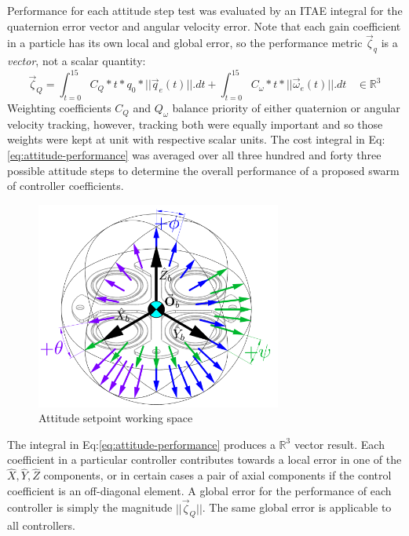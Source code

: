 \par
Performance for each attitude step test was evaluated by an ITAE integral for the quaternion error vector and angular velocity error. Note that each gain coefficient in a particle has its own local and global error, so the performance metric $\vec{\zeta}_{q}$ is a \emph{vector}, not a scalar quantity:
\begin{equation}\label{eq:attitude-performance}
\vec{\zeta}_{Q}=\int_{t=0}^{15}C_Q*t*q_0*||\vec{q}_e(t)||.dt+\int_{t=0}^{15}C_\omega*t*||\vec{\omega}_e(t)||.dt~~~~\in\mathbb{R}^{3}
\end{equation}
Weighting coefficients $C_Q$ and $Q_\omega$ balance priority of either quaternion or angular velocity tracking, however, tracking both were equally important and so those weights were kept at unit with respective scalar units. The cost integral in Eq:\ref{eq:attitude-performance} was averaged over all three hundred and forty three possible attitude steps to determine the overall performance of a proposed swarm of controller coefficients.
\begin{figure}[htbp]
\vspace{-6pt}
\centering
\includegraphics[width=0.72\textwidth]{figs/attitude-setpoint}
\vspace{-6pt}
\caption{Attitude setpoint working space}
\vspace{-14pt}
\label{fig:attitude-setpoint}
\end{figure}
\par
The integral in Eq:\ref{eq:attitude-performance} produces a $\mathbb{R}^{3}$ vector result. Each coefficient in a particular controller contributes towards a local error in one of the $\hat{X},\hat{Y},\hat{Z}$ components, or in certain cases a pair of axial components if the control coefficient is an off-diagonal element. A global error for the performance of each controller is simply the magnitude $||\vec{\zeta}_Q||$. The same global error is applicable to all controllers. 
